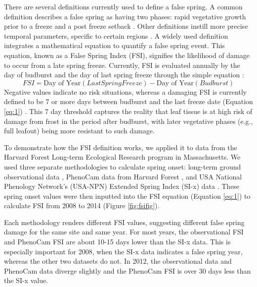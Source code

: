 \documentclass{article}\usepackage[]{graphicx}\usepackage[]{color}
\begin{document}
There are several definitions currently used to define a false spring. A common definition describes a false spring as having two phases: rapid vegetative growth prior to a freeze and a post freeze setback \citep{Gu2008}. Other definitions instill more precise temporal parameters, specific to certain regions \citep[e.g., in][false spring for the Midwestern United States is defined as a warmer than average March, a freezing April, and enough growing degree days between budburst and the last freeze date]{Augspurger2013}. A widely used definition integrates a mathematical equation to quantify a false spring event. This equation, known as a False Spring Index (FSI), signifies the likelihood of damage to occur from a late spring freeze. Currently, FSI is evaluated annually by the day of budburst and the day of last spring freeze \citep[often calculated at -2.2$^{\circ}$C][]{Schwartz1993} through the simple equation \citep{Marino2011}:
\begin{equation} \label{eq:1}
FSI = \text{Day of Year} (Last Spring Freeze) - \text{Day of Year} (Budburst)
\end{equation}
Negative values indicate no risk situations, whereas a damaging FSI is currently defined to be 7 or more days between budburst and the last freeze date (Equation \ref{eq:1}) \citep{Peterson2014}. This 7 day threshold captures the reality that leaf tissue is at high risk of damage from frost in the period after budburst, with later vegetative phases (e.g., full leafout) being more resistant to such damage.%

To demonstrate how the FSI definition works, we applied it to data from the Harvard Forest Long-term Ecological Research program in Massachusetts. We used three separate methodologies to calculate spring onset: long-term ground observational data \citep{Okeefe2014}, PhenoCam data from Harvard Forest \citep{Richardson2015}, and USA National Phenology Network's (USA-NPN) Extended Spring Index (SI-x) data \citep{USA-NPN2016}. These spring onset values were then inputted into the FSI equation (Equation \ref{eq:1}) to calculate FSI from 2008 to 2014 (Figure \ref{fig:fsifig}). 

Each methodology renders different FSI values, suggesting different false spring damage for the same site and same year. For most years, the observational FSI and PhenoCam FSI are about 10-15 days lower than the SI-x data. This is especially important for 2008, when the SI-x data indicates a false spring year, whereas the other two datasets do not. In 2012, the observational data and PhenoCam data diverge slightly and the PhenoCam FSI is over 30 days less than the SI-x value.
\end{document}
